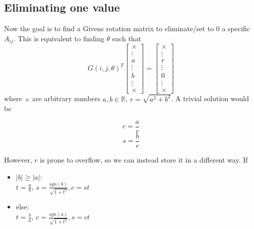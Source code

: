 \documentclass[a4paper]{scrartcl}
\begin{document}
    \subsection{Eliminating one value}
        Now the goal is to find a Givens rotation matrix to eliminate/set to 0 a
        specific $A_{ij}$. This is equivalent to finding $\theta$ such that
        \begin{equation}
            G(i,j,\theta)^T \begin{bmatrix} 
                \times\\
                \vdots\\
                a\\
                \vdots\\
                b\\
                \vdots\\
                \times
                \end{bmatrix}
            = \begin{bmatrix} 
                \times\\
                \vdots\\
                r\\
                \vdots\\
                0\\
                \vdots\\
                \times
                \end{bmatrix}
        \end{equation}
        where $\times$ are arbitrary numbers $a,b \in \mathbb{R}$, $r=\sqrt{a^2+b^2}$. 
        A trivial solution would be 
        \begin{multicols}{2}
            \begin{equation}
                c = \frac{a}{r}
            \end{equation}\break
            \begin{equation}
                s = \frac{b}{r}
            \end{equation}
          \end{multicols}
        However, $r$ is prone to overflow, so we can instead store it in a
        different way. If
        \begin{itemize}
            \item $\lvert b \rvert \geq \lvert a \rvert$:\\
                $t=\frac{a}{b}$, $s=\frac{sgn(b)}{\sqrt{1+t^2}}, c=st$
            \item else:\\
                $t=\frac{b}{a}$, $c=\frac{sgn(a)}{\sqrt{1+t^2}}, s=ct$
        \end{itemize}
\end{document}
